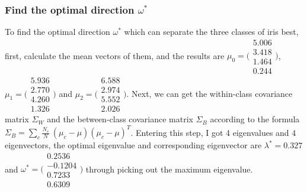 \documentclass[a4paper, 12pt]{article}
\begin{document}
    \subsubsection{Find the optimal direction $\omega^*$}
      To find the optimal direction $\omega^*$ which can separate the three classes of iris best, first, calculate the mean vectors of them, and the results are 
      $\mu_0=
      \Bigg(
      \begin{array}{c}
        5.006 \\
        3.418 \\
        1.464 \\
        0.244
      \end{array}
      \Bigg)$,
      $\mu_1=
      \Bigg(
      \begin{array}{c}
        5.936 \\
        2.770 \\
        4.260 \\
        1.326
      \end{array}
      \Bigg)$ and
      $\mu_2=
      \Bigg(
      \begin{array}{c}
        6.588 \\
        2.974 \\
        5.552 \\
        2.026
      \end{array}
      \Bigg)$. Next, we can get the within-class covariance matrix $\Sigma_W$ and the between-class covariance matrix $\Sigma_B$ according to the formula $\Sigma_B = \sum_{c} \frac{N_c}{N}\ (\mu_c-\mu)(\mu_c-\mu)^T$. Entering this step, I got 4 eigenvalues and 4 eigenvectors, the optimal eigenvalue and corresponding eigenvector are $\lambda^*=0.327$ and 
      $\omega^*=
      \Bigg(
      \begin{array}{c}
        0.2536 \\
        -0.1204 \\
        0.7233 \\
        0.6309
      \end{array}
      \Bigg)$
      through picking out the maximum eigenvalue.
\end{document}
